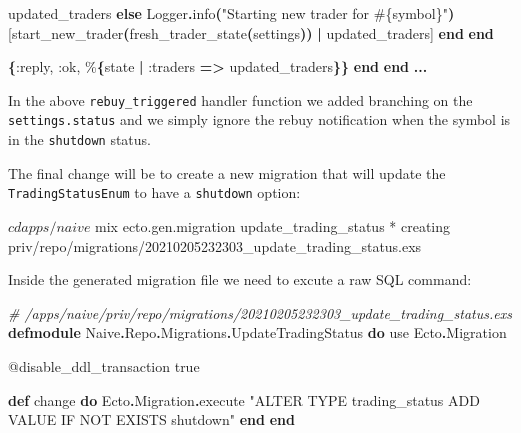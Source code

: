 \documentclass[
  oneside]{book}
\newenvironment{Shaded}{\begin{snugshade}}{\end{snugshade}}
\newcommand{\CommentTok}[1]{\textcolor[rgb]{0.56,0.35,0.01}{\textit{#1}}}
\newcommand{\ConstantTok}[1]{\textcolor[rgb]{0.56,0.35,0.01}{#1}}
\newcommand{\ControlFlowTok}[1]{\textcolor[rgb]{0.13,0.29,0.53}{\textbf{#1}}}
\newcommand{\ExtensionTok}[1]{#1}
\newcommand{\FunctionTok}[1]{\textcolor[rgb]{0.13,0.29,0.53}{\textbf{#1}}}
\newcommand{\ImportTok}[1]{#1}
\newcommand{\KeywordTok}[1]{\textcolor[rgb]{0.13,0.29,0.53}{\textbf{#1}}}
\newcommand{\NormalTok}[1]{#1}
\newcommand{\OperatorTok}[1]{\textcolor[rgb]{0.81,0.36,0.00}{\textbf{#1}}}
\newcommand{\OtherTok}[1]{\textcolor[rgb]{0.56,0.35,0.01}{#1}}
\newcommand{\StringTok}[1]{\textcolor[rgb]{0.31,0.60,0.02}{#1}}
\newcommand{\VariableTok}[1]{\textcolor[rgb]{0.00,0.00,0.00}{#1}}
\begin{document}
\begin{Shaded}
\begin{Highlighting}[]
\NormalTok{              updated\_traders}
            \ControlFlowTok{else}
              \ConstantTok{Logger}\OperatorTok{.}\NormalTok{info}\FunctionTok{(}\StringTok{"Starting new trader for }\OtherTok{\#\{}\NormalTok{symbol}\OtherTok{\}}\StringTok{"}\FunctionTok{)}
              \OtherTok{[}\NormalTok{start\_new\_trader}\FunctionTok{(}\NormalTok{fresh\_trader\_state}\FunctionTok{(}\NormalTok{settings}\FunctionTok{))} \OperatorTok{|}\NormalTok{ updated\_traders}\OtherTok{]}
            \KeywordTok{end}
          \KeywordTok{end}

        \FunctionTok{\{}\VariableTok{:reply}\NormalTok{, }\VariableTok{:ok}\NormalTok{, \%}\FunctionTok{\{}\NormalTok{state }\OperatorTok{|} \VariableTok{:traders} \OperatorTok{=\textgreater{}}\NormalTok{ updated\_traders}\FunctionTok{\}\}}
    \KeywordTok{end}
  \KeywordTok{end}
  \OperatorTok{...}
\end{Highlighting}
\end{Shaded}

In the above \texttt{rebuy\_triggered} handler function we added branching on the \texttt{settings.status} and we simply ignore the rebuy notification when the symbol is in the \texttt{shutdown} status.

The final change will be to create a new migration that will update the \texttt{TradingStatusEnum} to have a \texttt{shutdown} option:

\begin{Shaded}
\begin{Highlighting}[]
\ExtensionTok{$}\NormalTok{ cd apps/naive }
\ExtensionTok{$}\NormalTok{ mix ecto.gen.migration update\_trading\_status}
\ExtensionTok{*}\NormalTok{ creating priv/repo/migrations/20210205232303\_update\_trading\_status.exs}
\end{Highlighting}
\end{Shaded}

Inside the generated migration file we need to excute a raw SQL command:

\begin{Shaded}
\begin{Highlighting}[]
\CommentTok{\# /apps/naive/priv/repo/migrations/20210205232303\_update\_trading\_status.exs}
\KeywordTok{defmodule} \ConstantTok{Naive}\OperatorTok{.}\ConstantTok{Repo}\OperatorTok{.}\ConstantTok{Migrations}\OperatorTok{.}\ConstantTok{UpdateTradingStatus} \KeywordTok{do}
  \ImportTok{use} \ConstantTok{Ecto}\OperatorTok{.}\ConstantTok{Migration}

  \OtherTok{@disable\_ddl\_transaction} \ConstantTok{true}

  \KeywordTok{def}\NormalTok{ change }\KeywordTok{do}
    \ConstantTok{Ecto}\OperatorTok{.}\ConstantTok{Migration}\OperatorTok{.}\NormalTok{execute }\StringTok{"ALTER TYPE trading\_status ADD VALUE IF NOT EXISTS \textquotesingle{}shutdown\textquotesingle{}"}
  \KeywordTok{end}
\KeywordTok{end}
\end{Highlighting}
\end{Shaded}
\end{document}
